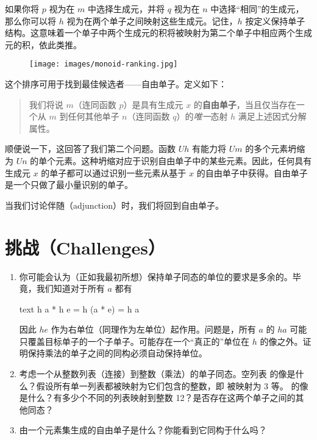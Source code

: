 如果你将 $p$ 视为在 $m$ 中选择生成元，并将 $q$ 视为在 $n$ 中选择“相同”的生成元，那么你可以将 $h$ 视为在两个单子之间映射这些生成元。记住，$h$ 按定义保持单子结构。这意味着一个单子中两个生成元的积将被映射为第二个单子中相应两个生成元的积，依此类推。

\begin{figure}[H]
  \centering
  \texttt{[image: images/monoid-ranking.jpg]}
\end{figure}

\noindent
这个排序可用于找到最佳候选者——自由单子。定义如下：

\begin{quote}
  我们将说 $m$（连同函数 $p$）是具有生成元 $x$ 的\textbf{自由单子}，当且仅当存在一个从 $m$ 到任何其他单子 $n$（连同函数 $q$）的\emph{唯一}态射 $h$ 满足上述因式分解属性。
\end{quote}
顺便说一下，这回答了我们第二个问题。函数 $U h$ 有能力将 $U m$ 的多个元素坍缩为 $U n$ 的单个元素。这种坍缩对应于识别自由单子中的某些元素。因此，任何具有生成元 $x$ 的单子都可以通过识别一些元素从基于 $x$ 的自由单子中获得。自由单子是一个只做了最小量识别的单子。

当我们讨论伴随（adjunction）时，我们将回到自由单子。

\section{挑战（Challenges）}

\begin{enumerate}
  \tightlist
  \item
  你可能会认为（正如我最初所想）保持单子同态的单位的要求是多余的。毕竟，我们知道对于所有 $a$ 都有

  \begin{snip}{text}
    h a * h e = h (a * e) = h a
  \end{snip}
  因此 $h e$ 作为右单位（同理作为左单位）起作用。问题是，所有 $a$ 的 $h a$ 可能只覆盖目标单子的一个子单子。可能存在一个“真正的”单位在 $h$ 的像之外。证明保持乘法的单子之间的同构必须自动保持单位。
  \item
  考虑一个从整数列表（连接）到整数（乘法）的单子同态。空列表 \code{{[}{]}} 的像是什么？假设所有单一列表都被映射为它们包含的整数，即 \code{{[}3{]}} 被映射为 3 等。 \code{{[}1, 2, 3, 4{]}} 的像是什么？有多少个不同的列表映射到整数 12？是否存在这两个单子之间的其他同态？
  \item
  由一个元素集生成的自由单子是什么？你能看到它同构于什么吗？
\end{enumerate}
